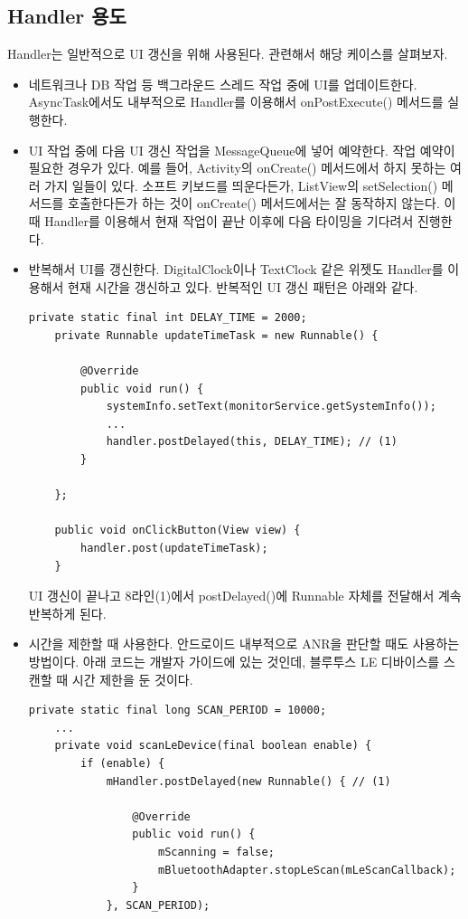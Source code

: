 \subsection{Handler 용도}
Handler는 일반적으로 UI 갱신을 위해 사용된다. 관련해서 해당 케이스를 살펴보자.
\begin{itemize}
\item 네트워크나 DB 작업 등 백그라운드 스레드 작업 중에 UI를 업데이트한다. 
AsyncTask에서도 내부적으로 Handler를 이용해서 onPostExecute() 메서드를 실행한다.

\item UI 작업 중에 다음 UI 갱신 작업을 MessageQueue에 넣어 예약한다. 작업 예약이 필요한 경우가 있다.
예를 들어, Activity의 onCreate() 메서드에서 하지 못하는 여러 가지 일들이 있다. 소프트 키보드를 띄운다든가, ListView의 setSelection() 메서드를 호출한다든가 하는 것이 onCreate() 메서드에서는 잘 동작하지 않는다. 이때 Handler를 이용해서 현재 작업이 끝난 이후에 다음 타이밍을 기다려서 진행한다.

\item 반복해서 UI를 갱신한다. DigitalClock이나 TextClock 같은 위젯도 Handler를 이용해서 현재 시간을 갱신하고 있다.
반복적인 UI 갱신 패턴은 아래와 같다.
\begin{lstlisting}[frame=single] 
  	private static final int DELAY_TIME = 2000;
	private Runnable updateTimeTask = new Runnable() {

		@Override
		public void run() {
			systemInfo.setText(monitorService.getSystemInfo());
			...
			handler.postDelayed(this, DELAY_TIME); // (1)
		}

	};
	
	public void onClickButton(View view) {
		handler.post(updateTimeTask); 
	}
\end{lstlisting}
UI 갱신이 끝나고 8라인(1)에서 postDelayed()에 Runnable 자체를 전달해서 계속 반복하게 된다.

\item 시간을 제한할 때 사용한다. 안드로이드 내부적으로 ANR을 판단할 때도 사용하는 방법이다.
아래 코드는 개발자 가이드에 있는 것인데, 블루투스 LE 디바이스를 스캔할 때 시간 제한을 둔 것이다.
\begin{lstlisting}[frame=single] 
	private static final long SCAN_PERIOD = 10000;
	...
	private void scanLeDevice(final boolean enable) {
	    if (enable) {
	    	mHandler.postDelayed(new Runnable() { // (1)
	    		
	    		@Override
	    		public void run() {
	    			mScanning = false;
	    			mBluetoothAdapter.stopLeScan(mLeScanCallback);
	    		}
	    	}, SCAN_PERIOD);
	

\end{lstlisting}
\end{itemize}
